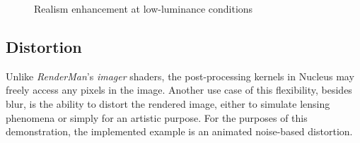 \begin{figure}[ht!]
  \centering
  \caption[Scotopic vision]{Realism enhancement at low-luminance conditions}
  \label{fig:postProcAcuityComparison}
\end{figure}

\subsection{Distortion}

Unlike \emph{RenderMan}'s \emph{imager} shaders, the post-processing kernels in Nucleus may freely access any pixels in the image. Another use case of this flexibility, besides blur, is the ability to distort the rendered image, either to simulate lensing phenomena or simply for an artistic purpose. For the purposes of this demonstration, the implemented example is an animated noise-based distortion.


